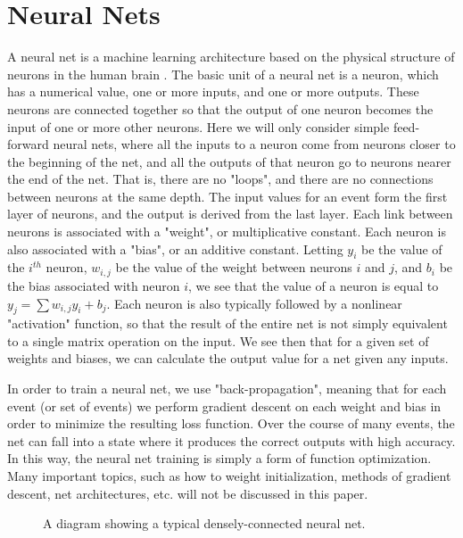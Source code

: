\section{Neural Nets}

A neural net is a machine learning architecture based on the physical structure of neurons in the human brain \cite{neural_net}. The basic unit of a neural net is a neuron, which has a numerical value, one or more inputs, and one or more outputs. These neurons are connected together so that the output of one neuron becomes the input of one or more other neurons. Here we will only consider simple feed-forward neural nets, where all the inputs to a neuron come from neurons closer to the beginning of the net, and all the outputs of that neuron go to neurons nearer the end of the net. That is, there are no "loops", and there are no connections between neurons at the same depth. The input values for an event form the first layer of neurons, and the output is derived from the last layer. Each link between neurons is associated with a "weight", or multiplicative constant. Each neuron is also associated with a "bias", or an additive constant. Letting $y_i$ be the value of the $i^{th}$ neuron, $w_{i,j}$ be the value of the weight between neurons $i$ and $j$, and $b_i$ be the bias associated with neuron $i$, we see that the value of a neuron is equal to $y_j = \sum{w_{i,j}y_i} + b_j$. Each neuron is also typically followed by a nonlinear "activation" function, so that the result of the entire net is not simply equivalent to a single matrix operation on the input. We see then that for a given set of weights and biases, we can calculate the output value for a net given any inputs.

In order to train a neural net, we use "back-propagation", meaning that for each event (or set of events) we perform gradient descent on each weight and bias in order to minimize the resulting loss function. Over the course of many events, the net can fall into a state where it produces the correct outputs with high accuracy. In this way, the neural net training is simply a form of function optimization. Many important topics, such as how to weight initialization, methods of gradient descent, net architectures, etc. will not be discussed in this paper.

\begin{figure}[t]
    \centering
    \caption{A diagram showing a typical densely-connected neural net.}
    \label{neural_net}
\end{figure}